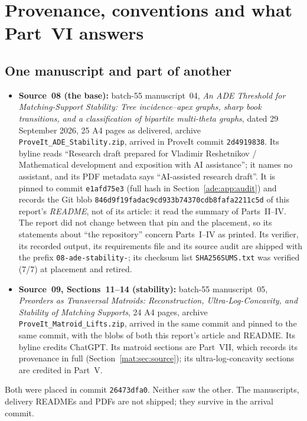 \documentclass[11pt]{article}
\numberwithin{equation}{section}
\theoremstyle{definition}
\begin{document}
\section{Provenance, conventions and what Part~VI answers}
\label{ade:sec:prov}

\subsection{One manuscript and part of another}
\label{ade:sec:source}
\begin{itemize}[leftmargin=1.4em]
\item \textbf{Source~08 (the base):} batch-55 manuscript~04, \emph{An ADE
Threshold for Matching-Support Stability: Tree incidence--apex graphs, sharp
book transitions, and a classification of bipartite multi-theta graphs},
dated 29 September 2026, 25 A4 pages as delivered, archive
\nolinkurl{ProveIt_ADE_Stability.zip}, arrived in ProveIt commit
\texttt{2d4919838}. Its byline reads ``Research draft prepared for Vladimir
Reshetnikov / Mathematical development and exposition with AI assistance'';
it names no assistant, and its PDF metadata says ``AI-assisted research
draft''. It is pinned to commit \texttt{e1afd75e3} (full hash in
Section~\ref{ade:app:audit}) and records the Git blob
\texttt{846d9f19fadac9cd933b\allowbreak 74370cdb8fafa2211c5d} of this report's
\emph{README}, not of its article: it read the summary of Parts~II--IV. The
report did not change between that pin and the placement, so its statements
about ``the repository'' concern Parts~I--IV as printed. Its verifier, its
recorded output, its requirements file and its source audit are shipped with
the prefix \texttt{08-ade-stability-}; its checksum list
\texttt{SHA256SUMS.txt} was verified (7/7) at placement and retired.
\item \textbf{Source~09, Sections~11--14 (stability):} batch-55 manuscript~05,
\emph{Preorders as Transversal Matroids: Reconstruction, Ultra-Log-Concavity,
and Stability of Matching Supports}, 24 A4 pages, archive
\nolinkurl{ProveIt_Matroid_Lifts.zip}, arrived in the same commit and pinned
to the same commit, with the blobs of both this report's article and README.
Its byline credits ChatGPT. Its matroid sections are Part~VII, which
records its provenance in full (Section~\ref{mat:sec:source}); its
ultra-log-concavity sections are credited in Part~V.
\end{itemize}
Both were placed in commit \texttt{26473dfa0}. Neither saw the other. The
manuscripts, delivery READMEs and PDFs are not shipped; they survive in the
arrival commit.
\end{document}
